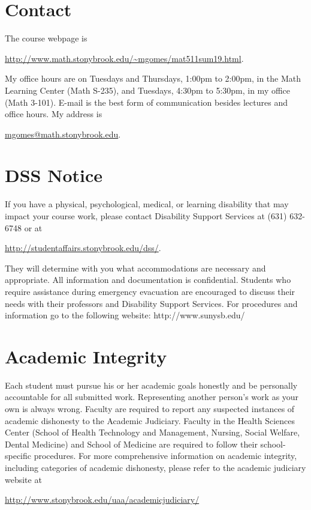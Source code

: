 \documentclass[11pt]{amsart}
\numberwithin{equation}{section}
\begin{document}
\section{Contact}
The course webpage is
\begin{center}
\url{http://www.math.stonybrook.edu/~mgomes/mat511sum19.html}.
\end{center}
My office hours are on Tuesdays and Thursdays, 1:00pm to 2:00pm, in the Math Learning Center (Math S-235), and Tuesdays, 4:30pm to 5:30pm, in my office (Math 3-101). E-mail is the best form of communication besides lectures and office hours. My address is
\begin{center}
\href{mailto: mgomes@math.stonybrook.edu}{ mgomes@math.stonybrook.edu}.
\end{center}

\section{DSS Notice}
If you have a physical, psychological, medical, or learning disability that may impact your course work, please contact Disability Support Services at (631) 632-6748 or at
\begin{center}
\url{http://studentaffairs.stonybrook.edu/dss/}.
\end{center}
They will determine with you what accommodations are necessary and appropriate. All information and documentation is confidential. Students who require assistance during emergency evacuation are encouraged to discuss their needs with their professors and Disability Support Services. For procedures and information go to the following website: http://www.sunysb.edu/

\section{Academic Integrity}
Each student must pursue his or her academic goals honestly and be personally accountable for all submitted work. Representing another person's work as your own is always wrong. Faculty are required to report any suspected instances of academic dishonesty to the Academic Judiciary. Faculty in the Health Sciences Center (School of Health Technology and Management, Nursing, Social Welfare, Dental Medicine) and School of Medicine are required to follow their school-specific procedures. For more comprehensive information on academic integrity, including categories of academic dishonesty, please refer to the academic judiciary website at
\begin{center}
\url{http://www.stonybrook.edu/uaa/academicjudiciary/}
\end{center}
\end{document}
